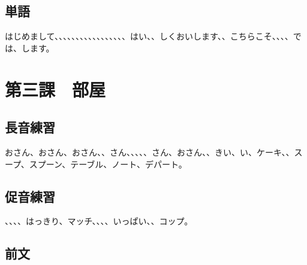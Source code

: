 \documentclass[a5j]{ltjtarticle}
\begin{document}
\subsection*{単語}

\begin{onehalfspace}
  はじめまして、、、、、、、、、、、、、、、、、はい、、しくおいします、、こちらこそ、、、、では、します。
\end{onehalfspace}

\section*{第三課　部屋}

\subsection*{長音練習}

\begin{onehalfspace}
  おさん、おさん、おさん、、さん、、、、、さん、おさん、、きい、い、ケーキ、、スープ、スプーン、テーブル、ノート、デパート。
\end{onehalfspace}

\subsection*{促音練習}

\begin{onehalfspace}
  、、、、はっきり、マッチ、、、、いっぱい、、コップ。
\end{onehalfspace}

\subsection*{前文}
\end{document}
